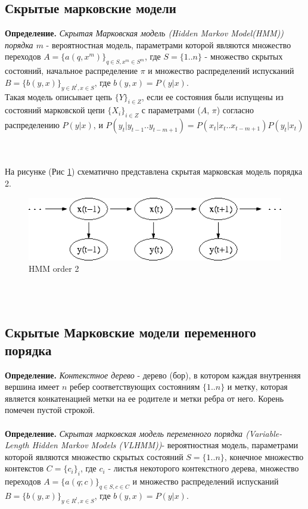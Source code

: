 \documentclass{matmex-diploma-custom}
\begin{document}
\subsection{Скрытые марковские модели}
\textbf{Определение.} \emph{Скрытая Марковская модель (Hidden Markov Model(HMM)) порядка $ m $} - вероятностная модель, параметрами которой являются множество переходов $ A = \{a(q, x^{m})\}_{q \in S, x^{m} \in S^{m}}$, где $ S = \{1..n\} $ - множество скрытых состояний, начальное распределение $\pi$ и множество распределений испусканий $ B = \{b(y,x)\}_{y \in R^{l}, x \in S}$, где $ b(y, x) = P(y|x)$. 
\\
Такая модель описывает цепь $\{Y\}_{i \in Z}$, если ее состояния были испущены из состояний марковской цепи $\{X_{i}\}_{i \in Z}$ с параметрами ($ A $, $ \pi $) согласно распределению $ P(y|x) $, и $ P(y_{t}|y_{t-1}..y_{t-m+1}) = P(x_{t}|x_{t}..x_{t-m+1})P(y_t|x_t)$  {
\\\\
На рисунке (Рис \ref{ris:image}) схематично представлена скрытая марковская модель порядка 2.
\\
\begin{figure}[hbtp]
\includegraphics[scale=0.4]{img/Hmm_temporal_bayesian_net.png}
\centering
\caption{HMM order 2}
\label{ris:image}
\end{figure}
\\\\
\subsection{Скрытые Марковские модели переменного порядка}
\textbf{Определение.} \textit{Контекстное дерево} - дерево (бор), в котором каждая внутренняя вершина имеет $ n $ ребер соответствующих состояниям $ \{1..n\} $ и метку, которая является конкатенацией метки на ее родителе и метки ребра от него. Корень помечен пустой строкой. 
\\\\
\textbf{Определение.} \textit{Скрытая марковская модель переменного порядка (Variable-Length Hidden Markov Models (VLHMM))}- вероятностная модель, параметрами которой являются множество скрытых состояний $ S = \{1..n\} $, конечное множество контекстов $ C=\{c_{i}\}_{i} $, где $ c_{i} $ - листья некоторого контекстного дерева, множество переходов $ A = \{a(q; c)\}_{q \in S, c \in C}$ и множество распределений испусканий $ B = \{b(y,x)\}_{y \in R^{l}, x \in S}$, где $ b(y, x) = P(y|x)$.  
\\\\\\
}
\end{document}
